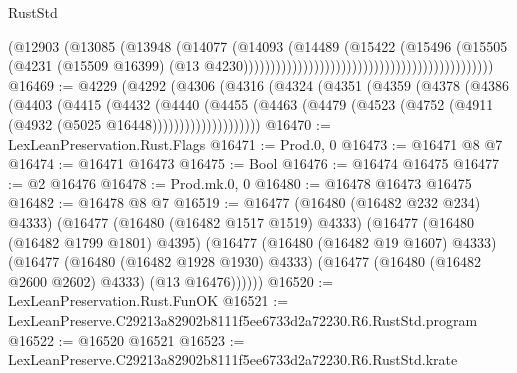 \begin{lexlean}{RustStd}
\begin{coremodule}
                                                                          (@12903
                                                                            (@13085
                                                                              (@13948
                                                                                (@14077
                                                                                  (@14093
                                                                                    (@14489
                                                                                      (@15422
                                                                                        (@15496
                                                                                          (@15505
                                                                                            (@4231
                                                                                              (@15509
                                                                                                @16399)
                                                                                              (@13
                                                                                                @4230))))))))))))))))))))))))))))))))))))))))))))))
@16469 := @4229
    (@4292
      (@4306
        (@4316
          (@4324
            (@4351
              (@4359
                (@4378
                  (@4386
                    (@4403
                      (@4415
                        (@4432
                          (@4440
                            (@4455
                              (@4463
                                (@4479 (@4523 (@4752 (@4911 (@4932 (@5025 @16448))))))))))))))))))))
@16470 := LexLeanPreservation.Rust.Flags
@16471 := Prod.{0, 0}
@16473 := @16471 @8 @7
@16474 := @16471 @16473
@16475 := Bool
@16476 := @16474 @16475
@16477 := @2 @16476
@16478 := Prod.mk.{0, 0}
@16480 := @16478 @16473 @16475
@16482 := @16478 @8 @7
@16519 := @16477
    (@16480 (@16482 @232 @234) @4333)
    (@16477
      (@16480 (@16482 @1517 @1519) @4333)
      (@16477
        (@16480 (@16482 @1799 @1801) @4395)
        (@16477
          (@16480 (@16482 @19 @1607) @4333)
          (@16477
            (@16480 (@16482 @1928 @1930) @4333)
            (@16477 (@16480 (@16482 @2600 @2602) @4333) (@13 @16476))))))
@16520 := LexLeanPreservation.Rust.FunOK
@16521 := LexLeanPreserve.C29213a82902b8111f5ee6733d2a72230.R6.RustStd.program
@16522 := @16520 @16521
@16523 := LexLeanPreserve.C29213a82902b8111f5ee6733d2a72230.R6.RustStd.krate

\end{coremodule}
\end{lexlean}
